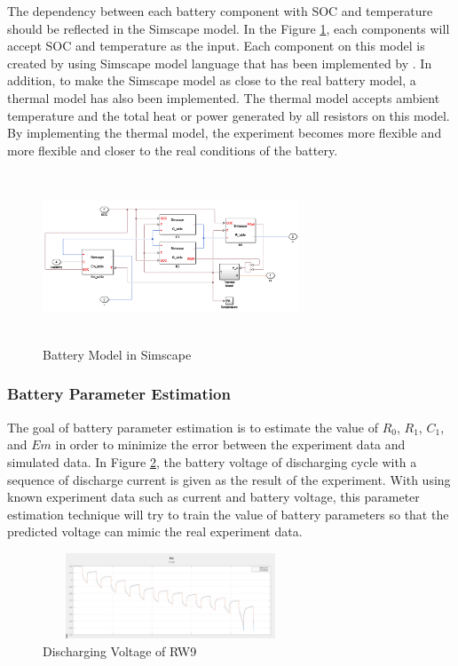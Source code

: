 The dependency between each battery component with SOC and temperature should be reflected in the Simscape model. In the Figure \ref{fig:battery_model_sim}, each components will accept SOC and temperature as the input. Each component on this model is created by using Simscape model language that has been implemented by \MATLAB. In addition, to make the Simscape model as close to the real battery model, a thermal model has also been implemented. The thermal model accepts ambient temperature and the total heat or power generated by all resistors on this model. By implementing the thermal model, the experiment becomes more flexible and  more flexible and closer to the real conditions of the battery.

\begin{figure}
\includegraphics[height=2in, width=3in]{figures/BatteryModelSimscape}
\caption{Battery Model in Simscape}
\label{fig:battery_model_sim}
\end{figure}

\subsubsection{Battery Parameter Estimation}

The goal of battery parameter estimation is to estimate the value of $R_0$, $R_1$, $C_1$, and $Em$ in order to minimize the error between the experiment data and simulated data. In Figure \ref{fig:discharging_voltage_RW9}, the battery voltage of discharging cycle with a sequence of discharge current is given as the result of the experiment. 
With using known experiment data such as current and battery voltage, this parameter estimation technique will try to train the value of battery parameters so that the predicted voltage can mimic the real experiment data.

\begin{figure}
\includegraphics[height=1in, width=3in]{figures/Discharging_01}
\caption{Discharging Voltage of RW9}
\label{fig:discharging_voltage_RW9}
\end{figure}

